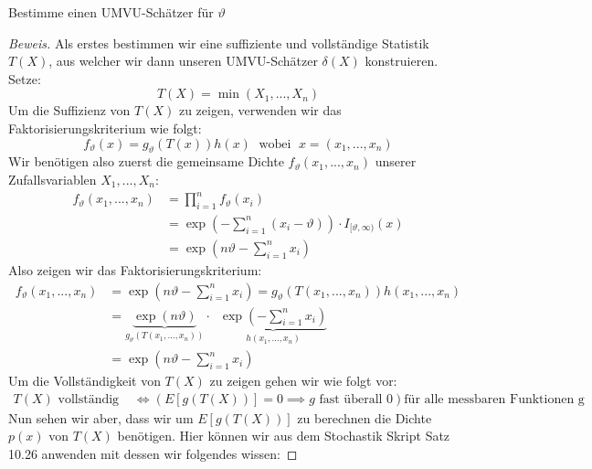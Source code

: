 \documentclass[a4paper]{article}
\newenvironment{Aufgabe}[2][Aufgabe]{\begin{trivlist}
\item[\hskip \labelsep {\bfseries #1}\hskip \labelsep {\bfseries #2.}]}{\end{trivlist}}
\begin{document}
	\begin{theorem} %
	\begin{Aufgabe}{1} %
		Bestimme einen UMVU-Schätzer für $\vartheta$
	\end{Aufgabe}

	\begin{proof}[Beweis]
		Als erstes bestimmen wir eine suffiziente und vollständige Statistik $T(X)$, aus welcher wir
		dann unseren UMVU-Schätzer $\delta(X)$ konstruieren.
		Setze:
		\[
			T(X) = \min \left(
				X_1, ..., X_{n}
			\right) 
		\] 
		Um die Suffizienz von $T(X)$ zu zeigen, verwenden wir das Faktorisierungskriterium wie folgt:
		\[
			f_\vartheta (x) = g_\vartheta (T(x)) h(x)
			\; \text{  wobei  } \; x = (x_1, ..., x_{n})
		\] 
		Wir benötigen also zuerst die gemeinsame Dichte $f_\vartheta (x_1, ..., x_{n})$ unserer Zufallsvariablen
		$X_{1}, ..., X_{n}$:
		\begin{align*}
			f_\vartheta ( x_1 ,..., x_{n}) &= \prod_{i=1}^{n} f_\vartheta (x_{i}) \\
				   &= \exp \left(
					   - \sum_{i=1}^{n} (x_{i} - \vartheta)
				   \right) \cdot I_{[\vartheta, \infty)} (x) \\
				   &= \exp \left(
				   		n \vartheta - \sum_{i=1}^{n} x_{i}
				   \right) 
		\end{align*}
		Also zeigen wir das Faktorisierungskriterium:
		\begin{align*}
			f_\vartheta (x_1 , ..., x_{n}) &= \exp \left(
				n \vartheta - \sum_{i=1}^{n} x_{i}
			\right) 
			= g_\vartheta (T(x_1 , ..., x_{n})) h(x_1 , ..., x_{n}) \\
			   &= \underbrace{ \exp (n \vartheta ) }_{ g_\vartheta (T(x_1 , ..., x_{n})) } \cdot \;\;
			   \underbrace{ \exp \left(
			   	- \sum_{i=1}^{n} x_{i}
			   \right)  }_{ h(x_1 , ..., x_{n}) } \\
			   &= \exp \left(
					n \vartheta - \sum_{i=1}^{n} x_{i}
			   \right) 
		\end{align*}
		Um die Vollständigkeit von $T(X)$ zu zeigen gehen wir wie folgt vor:
		\begin{align*}
			T(X) \text{ vollständig } & \Leftrightarrow 
			\left(
				E \left[
					g(T(X))
				\right] = 0
				\implies g \text{ fast überall 0}
			\right) \text{für alle messbaren Funktionen g}
		\end{align*}
		Nun sehen wir aber, dass wir um $E \left[
			g(T(X))
		\right] $ zu berechnen die Dichte $p(x)$ von $T(X)$ benötigen.
		Hier können wir aus dem Stochastik Skript Satz 10.26 anwenden mit dessen wir folgendes wissen:

\end{proof}
\end{theorem}
\end{document}

